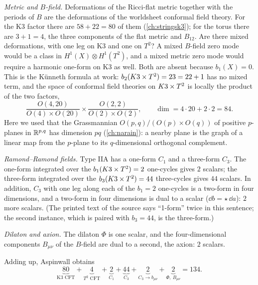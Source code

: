 \emph{Metric and $B$-field.} Deformations of the Ricci-flat metric together with the periods
of $B$ are the deformations of the worldsheet conformal field theory. For the K3 factor there
are $58+22=80$ of them (\cref{ch:stringsk3}); for the torus there are $3+1=4$, the three
components of the flat metric and $B_{12}$. Are there mixed deformations, with one leg on K3
and one on $T^2$? A mixed $B$-field zero mode would be a class in $H^1(X)\otimes H^1(T^2)$,
and a mixed metric zero mode would require a harmonic one-form on K3 as well. Both are absent
because $b_1(X)=0$. This is the K\"unneth formula at work: $b_2(K3\times T^2)=23=22+1$ has no mixed
term, and the space of conformal field theories on $K3\times T^2$ is locally the product of the two
factors,
\begin{equation}\label{eq:k3t2:nsns}
 \frac{O(4,20)}{O(4)\times O(20)}\times\frac{O(2,2)}{O(2)\times O(2)},\qquad
 \dim=4\cdot 20+2\cdot2=84 .
\end{equation}
Here we used that the Grassmannian $O(p,q)/(O(p)\times O(q))$ of
positive $p$-planes in $\mathbb{R}^{p,q}$ has dimension $pq$ (\cref{ch:narain}): a nearby plane is the
graph of a linear map from the $p$-plane to its $q$-dimensional orthogonal complement.

\emph{Ramond--Ramond fields.} Type IIA has a one-form $C_1$ and a three-form $C_3$. The
one-form integrated over the $b_1(K3\times T^2)=2$ one-cycles gives $2$ scalars; the three-form
integrated over the $b_3(K3\times T^2)=44$ three-cycles gives $44$ scalars. In addition, $C_3$ with one
leg along each of the $b_1=2$ one-cycles is a two-form in four dimensions, and a two-form in
four dimensions is dual to a scalar ($\dd b=\star\,\dd a$): $2$ more scalars. (The printed
text of the source says ``1-form'' twice in this sentence; the second instance, which is
paired with $b_3=44$, is the three-form.)

\emph{Dilaton and axion.} The dilaton $\Phi$ is one scalar, and the four-dimensional
components $B_{\mu\nu}$ of the $B$-field are dual to a second, the axion: $2$
scalars.

Adding up, Aspinwall obtains 
\begin{equation}\label{eq:k3t2:134}
 \underbrace{80}_{\text{K3 CFT}}+\underbrace{4}_{T^2\text{ CFT}}
 +\underbrace{2}_{C_1}+\underbrace{44}_{C_3}+\underbrace{2}_{C_3\to b_{\mu\nu}}
 +\underbrace{2}_{\Phi,\ B_{\mu\nu}}=134 .
\end{equation}

